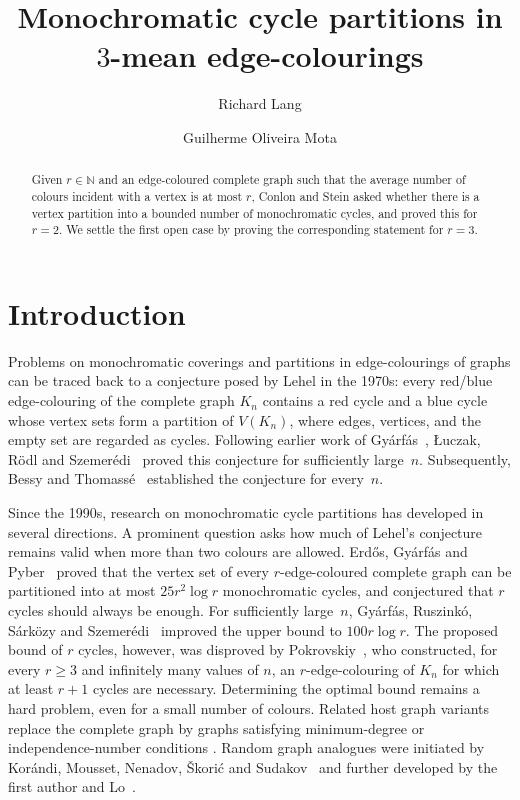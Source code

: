 \documentclass[a4paper,12pt,reqno]{amsart}
\title{Monochromatic cycle partitions in $3$-mean edge-colourings}
\author{Richard Lang}
\author{Guilherme Oliveira Mota}
\date{}
\begin{document}
\begin{abstract}
  Given $r \in \mathbb{N}$ and an edge-coloured complete graph such that the average number of colours incident with a vertex is at most $r$, Conlon and Stein asked whether there is a vertex partition into a bounded
  number of monochromatic cycles, and proved this for $r=2$. We settle the
  first open case by proving the corresponding statement for $r=3$.
\end{abstract}

\maketitle

\section{Introduction}
Problems on monochromatic coverings and partitions in edge-colourings of
graphs can be traced back to a conjecture posed by Lehel in the 1970s: every
red/blue edge-colouring of the complete graph $K_n$ contains a red cycle and a
blue cycle whose vertex sets form a partition of $V(K_n)$, where edges,
vertices, and the empty set are regarded as cycles. Following earlier work of
Gyárfás~\cite{Gyarfas1983}, Łuczak, Rödl and
Szemerédi~\cite{LuczakRodlSzemeredi1998} proved this conjecture for
sufficiently large~$n$. 
Subsequently, Bessy and Thomassé~\cite{BessyThomasse2010} established the conjecture for every~$n$.

Since the 1990s, research on monochromatic cycle partitions has developed in
several directions. A prominent question asks how much of Lehel's conjecture
remains valid when more than two colours are allowed. Erdős, Gyárfás and
Pyber~\cite{ErdosGyarfasPyber1991} proved that the vertex set of every
$r$-edge-coloured complete graph can be partitioned into at most $25r^2\log r$
monochromatic cycles, and conjectured that $r$ cycles should always be enough.
For sufficiently large~$n$, Gyárfás, Ruszinkó, Sárközy and
Szemerédi~\cite{GRSS2006} improved the upper bound to $100r\log r$. The proposed
bound of $r$ cycles, however, was disproved by Pokrovskiy~\cite{Pokrovskiy2014},
who constructed, for every $r\geq 3$ and infinitely many values of $n$, an
$r$-edge-colouring of $K_n$ for which at least $r+1$ cycles are necessary.
Determining the optimal bound remains a hard problem, even for a small
number of colours. Related host graph variants replace the complete
graph by graphs satisfying minimum-degree or independence-number conditions
\cite{AllenEtAl2024,DeBiasioNelsen2017,DiBraccioPatel2026,
KorandiLangLetzterPokrovskiy2021,Letzter2019,Sarkozy2011}. Random graph
analogues were initiated by Kor\'andi, Mousset, Nenadov, \v{S}kori\'c and
Sudakov~\cite{KorandiEtAl2018} and further developed by the first author and
Lo~\cite{LangLo2021}.
\end{document}
